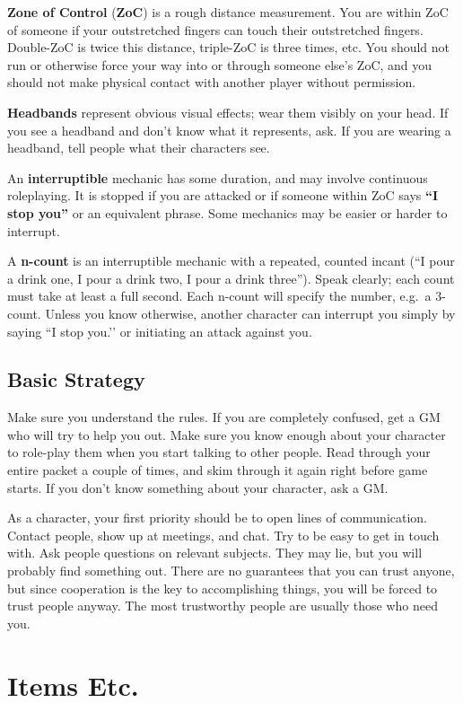\documentclass[sheet]{GL2020}
\begin{document}
{\bf Zone of Control} ({\bf ZoC}) is a rough distance measurement. You are within ZoC of someone if your outstretched fingers can touch their outstretched fingers.  Double-ZoC is twice this distance, triple-ZoC is three times, etc. You should not run or otherwise force your way into or through someone else's ZoC, and you should not make physical contact with another player without permission.

{\bf Headbands} represent obvious visual effects; wear them visibly on your head. If you see a headband and don't know what it represents, ask. If you are wearing a headband, tell people what their characters see.

An {\bf interruptible} mechanic has some duration, and may involve continuous roleplaying.  It is stopped if you are attacked or if someone within ZoC says {\bf ``I stop you''} or an equivalent phrase. Some mechanics may be easier or harder to interrupt.

A {\bf n-count} is an interruptible mechanic with a repeated, counted incant (``I pour a drink one, I pour a drink two, I pour a drink three'').  Speak clearly; each count must take at least a full second. Each n-count will specify the number, e.g.\ a 3-count. Unless you know otherwise, another character can interrupt you simply by saying ``I stop you.’’ or initiating an attack against you.

\subsection{Basic Strategy}

Make sure you understand the rules.  If you are completely confused, get a GM who will try to help you out.  Make sure you know enough about your character to role-play them when you start talking to other people. Read through your entire packet a couple of times, and skim through it again right before game starts.  If you don't know something about your character, ask a GM.

As a character, your first priority should be to open lines of communication. Contact people, show up at meetings, and chat. Try to be easy to get in touch with. Ask people questions on relevant subjects. They may lie, but you will probably find something out. There are no guarantees that you can trust anyone, but since cooperation is the key to accomplishing things, you will be forced to trust people anyway. The most trustworthy people are usually those who need you.

\clearpage
\section{Items Etc.}
\end{document}
